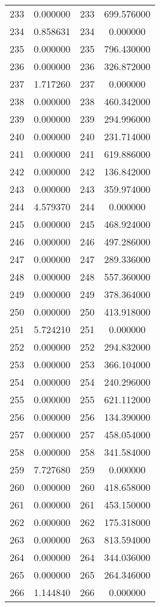 \documentclass[12pt]{article}
\begin{document}
\begin{longtable}{@{}cccc@{}}
233 & 0.000000 & 233 & 699.576000 \\
234 & 0.858631 & 234 & 0.000000 \\
235 & 0.000000 & 235 & 796.430000 \\
236 & 0.000000 & 236 & 326.872000 \\
237 & 1.717260 & 237 & 0.000000 \\
238 & 0.000000 & 238 & 460.342000 \\
239 & 0.000000 & 239 & 294.996000 \\
240 & 0.000000 & 240 & 231.714000 \\
241 & 0.000000 & 241 & 619.886000 \\
242 & 0.000000 & 242 & 136.842000 \\
243 & 0.000000 & 243 & 359.974000 \\
244 & 4.579370 & 244 & 0.000000 \\
245 & 0.000000 & 245 & 468.924000 \\
246 & 0.000000 & 246 & 497.286000 \\
247 & 0.000000 & 247 & 289.336000 \\
248 & 0.000000 & 248 & 557.360000 \\
249 & 0.000000 & 249 & 378.364000 \\
250 & 0.000000 & 250 & 413.918000 \\
251 & 5.724210 & 251 & 0.000000 \\
252 & 0.000000 & 252 & 294.832000 \\
253 & 0.000000 & 253 & 366.104000 \\
254 & 0.000000 & 254 & 240.296000 \\
255 & 0.000000 & 255 & 621.112000 \\
256 & 0.000000 & 256 & 134.390000 \\
257 & 0.000000 & 257 & 458.054000 \\
258 & 0.000000 & 258 & 341.584000 \\
259 & 7.727680 & 259 & 0.000000 \\
260 & 0.000000 & 260 & 418.658000 \\
261 & 0.000000 & 261 & 453.150000 \\
262 & 0.000000 & 262 & 175.318000 \\
263 & 0.000000 & 263 & 813.594000 \\
264 & 0.000000 & 264 & 344.036000 \\
265 & 0.000000 & 265 & 264.346000 \\
266 & 1.144840 & 266 & 0.000000 \\

\end{longtable}
\end{document}
